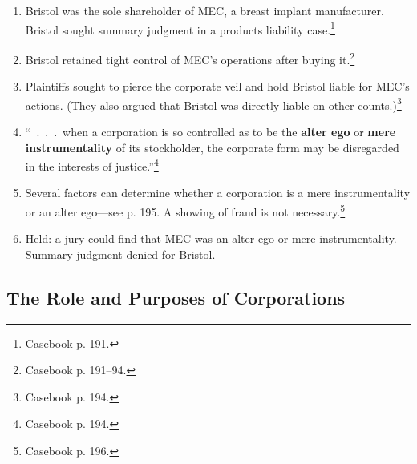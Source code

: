 \begin{enumerate}
    \item Bristol was the sole shareholder of MEC, a breast implant 
    manufacturer. Bristol sought summary judgment in a products liability 
    case.\footnote{Casebook p. 191.}
    \item Bristol retained tight control of MEC's operations after buying 
    it.\footnote{Casebook p. 191--94.}
    \item Plaintiffs sought to pierce the corporate veil and hold Bristol 
    liable for MEC's actions. (They also argued that Bristol was directly 
    liable on other counts.)\footnote{Casebook p. 194.}
    \item ``~.~.~.~when a corporation is so controlled as to be the 
    \textbf{alter ego} or \textbf{mere instrumentality} of its stockholder, 
    the corporate form may be disregarded in the interests of 
    justice.''\footnote{Casebook p. 194.}
    \item Several factors can determine whether a corporation is a mere 
    instrumentality or an alter ego---see p. 195. A showing of fraud is not 
    necessary.\footnote{Casebook p. 196.}
    \item Held: a jury could find that MEC was an alter ego or mere 
    instrumentality. Summary judgment denied for Bristol.
\end{enumerate}

\newpage %

\subsection{The Role and Purposes of Corporations}


